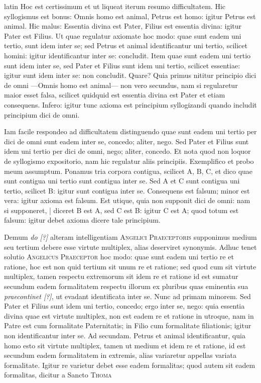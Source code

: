 \begin{otherlanguage*}{latin}
\pstart
 Hoc est certissimum et ut liqueat iterum resumo difficultatem. Hic syllogismus est bonus: Omnis homo est animal, Petrus est homo: igitur Petrus est animal. Hic malus: Essentia divina est Pater, Filius est essentia divina: igitur Pater est Filius. Ut quae regulatur axiomate hoc modo: quae sunt eadem uni tertio, sunt idem inter se; sed Petrus et animal identificantur uni tertio, scilicet homini: igitur identificantur inter se: concludit. Item quae sunt eadem uni tertio sunt idem inter se, sed Pater et Filius sunt idem uni tertio, scilicet essentiae: igitur sunt idem inter se: non concludit. Quare? Quia primus nititur principio dici de omni —Omnis homo est animal— non vero secundus, nam si regularetur maior esset falsa, scilicet quidquid est essentia divina est Pater et etiam consequens. Infero: igitur tunc axioma est principium syllogizandi quando includit principium dici de omni. 
\pend

\pstart
 Iam facile respondeo ad difficultatem distinguendo quae sunt eadem uni tertio per dici de omni sunt eadem inter se, concedo; aliter, nego. Sed Pater et Filius sunt idem uni tertio per dici de omni, nego; aliter, concedo. Et nota quod non loquor de syllogismo expositorio, nam hic regulatur aliis principiis. Exemplifico et probo meum assumptum. Ponamus tria corpora contigua, scilicet A, B, C, et dico quae sunt contigua uni tertio sunt contigua inter se. Sed A et C sunt contigua uni tertio, scilicet B: igitur sunt contigua inter se. Consequens est falsum; minor est vera: igitur axioma est falsum. Est utique, quia non supponit dici de omni: nam si supponeret, \textnormal{|} diceret B est A, sed C est B: igitur C est A; quod totum est falsum: igitur debet axioma dicere tale principium. 
\pend

\pstart
 Demum \emph{do [?]} alteram intelligentiam \textsc{Angelici Praeceptoris} supponimus medium seu tertium debere esse virtute multiplex, alias deserviret synonymis. Adhuc tenet solutio \textsc{Angelicus Praeceptor} hoc modo: quae sunt eadem uni tertio re et ratione, hoc est non quid tertium sit unum re et ratione; sed quod cum sit virtute multiplex, tamen respectu extremorum sit idem re et ratione id est sumatur secundum eadem formalitatem respectu illorum ex pluribus quas eminentia sua \emph{praecontinet [?]}, ut evadant identificata inter se. Nunc ad primam minorem. Sed Pater et Filius sunt idem uni tertio, concedo; ergo inter se, nego: quia essentia divina quae est virtute multiplex, non est eadem re et ratione in utroque, nam in Patre est cum formalitate Paternitatis; in Filio cum formalitate filiationis; igitur non identificantur inter se. Ad secundam. Petrus et animal identificantur, quia homo esto sit virtute multiplex, tamen ut medium et idem re et ratione, id est secundum eadem formalitatem in extremis, alias variaretur appellas variata formalitate. Igitur re varietur debet esse eadem formalitas; quod autem sit eadem formalitas, dicitur a Sancto \textsc{Thoma} 
\pend


\end{otherlanguage*}
